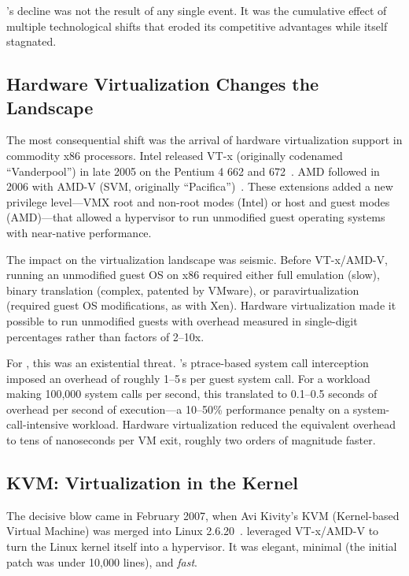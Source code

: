 \UML{}'s decline was not the result of any single event.  It was the
cumulative effect of multiple technological shifts that eroded its competitive
advantages while \UML{} itself stagnated.

\subsection{Hardware Virtualization Changes the Landscape}
\label{sec:history-hwvirt}

The most consequential shift was the arrival of hardware virtualization
support in commodity x86 processors.  Intel released VT-x (originally
codenamed ``Vanderpool'') in late 2005 on the Pentium 4 662 and
672~\cite{intel-vt}.  AMD followed in 2006 with AMD-V (SVM, originally
``Pacifica'')~\cite{amd-svm}.  These extensions added a new privilege
level---VMX root and non-root modes (Intel) or host and guest modes
(AMD)---that allowed a hypervisor to run unmodified guest operating systems
with near-native performance.

The impact on the virtualization landscape was seismic.  Before VT-x/AMD-V,
running an unmodified guest OS on x86 required either full emulation
(slow), binary translation (complex, patented by VMware), or
paravirtualization (required guest OS modifications, as with Xen).
Hardware virtualization made it possible to run unmodified guests with
overhead measured in single-digit percentages rather than factors of 2--10x.

For \UML{}, this was an existential threat.  \UML{}'s ptrace-based system
call interception imposed an overhead of roughly 1--5\,\textmu{}s per guest
system call.  For a workload making 100,000 system calls per second, this
translated to 0.1--0.5 seconds of overhead per second of execution---a
10--50\% performance penalty on a system-call-intensive workload.  Hardware
virtualization reduced the equivalent overhead to tens of nanoseconds per
VM exit, roughly two orders of magnitude faster.

\subsection{KVM: Virtualization in the Kernel}
\label{sec:history-kvm}

The decisive blow came in February 2007, when Avi Kivity's KVM (Kernel-based
Virtual Machine) was merged into Linux 2.6.20~\cite{kivity2007}.  \KVM{}
leveraged VT-x/AMD-V to turn the Linux kernel itself into a hypervisor.  It
was elegant, minimal (the initial patch was under 10,000 lines), and
\emph{fast}.

